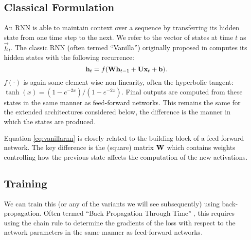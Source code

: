 \subsection{Classical Formulation}
An RNN is able to maintain context over a sequence by transferring its hidden state from one
time step to the next. We refer to the vector of states at time \(t\) as \(\vec{h}_t\).
The classic RNN (often termed ``Vanilla'') originally proposed in \autocite{Elman1990}
computes its hidden states with the following recurrence:
\begin{equation}
	\mathbf{h}_t = f(\mathbf{W}\mathbf{h}_{t-1} + \mathbf{U}\mathbf{x}_t +  \mathbf{b}).
\label{eq:vanillarnn}
\end{equation} \(f(\cdot)\) is again some element-wise non-linearity, often the hyperbolic tangent:
\(\tanh(x) = (1 - e^{-2x}) / (1 + e^{-2x})\). Final outputs are computed from these
states in the same manner as feed-forward networks. This remains the same for the
extended architectures considered below, the difference is the manner in which the states
are produced.

Equation \eqref{eq:vanillarnn} is closely related to the building block of a 
feed-forward network. The key difference is the (square) matrix \(\mathbf{W}\) which contains weights
controlling how the previous state affects the computation of the new activations.

\subsection{Training}
We can train this (or any of the variants we will see subsequently) using back-propagation.
Often termed ``Back Propagation Through Time'' \autocite{Werbos1990}, this requires using the
chain rule to determine the gradients of the loss with respect to the network parameters in
the same manner as feed-forward networks.

